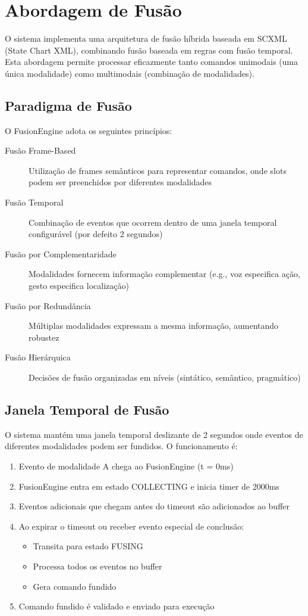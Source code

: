 \section{Abordagem de Fusão}

O sistema implementa uma arquitetura de fusão híbrida baseada em SCXML (State Chart XML), combinando fusão baseada em regras com fusão temporal. Esta abordagem permite processar eficazmente tanto comandos unimodais (uma única modalidade) como multimodais (combinação de modalidades).

\subsection{Paradigma de Fusão}

O FusionEngine adota os seguintes princípios:

\begin{description}
    \item[Fusão Frame-Based] Utilização de frames semânticos para representar comandos, onde slots podem ser preenchidos por diferentes modalidades
    \item[Fusão Temporal] Combinação de eventos que ocorrem dentro de uma janela temporal configurável (por defeito 2 segundos)
    \item[Fusão por Complementaridade] Modalidades fornecem informação complementar (e.g., voz especifica ação, gesto especifica localização)
    \item[Fusão por Redundância] Múltiplas modalidades expressam a mesma informação, aumentando robustez
    \item[Fusão Hierárquica] Decisões de fusão organizadas em níveis (sintático, semântico, pragmático)
\end{description}

\subsection{Janela Temporal de Fusão}

O sistema mantém uma janela temporal deslizante de 2 segundos onde eventos de diferentes modalidades podem ser fundidos. O funcionamento é:

\begin{enumerate}
    \item Evento de modalidade A chega ao FusionEngine (t = 0ms)
    \item FusionEngine entra em estado COLLECTING e inicia timer de 2000ms
    \item Eventos adicionais que chegam antes do timeout são adicionados ao buffer
    \item Ao expirar o timeout ou receber evento especial de conclusão:
    \begin{itemize}
        \item Transita para estado FUSING
        \item Processa todos os eventos no buffer
        \item Gera comando fundido
    \end{itemize}
    \item Comando fundido é validado e enviado para execução
\end{enumerate}

